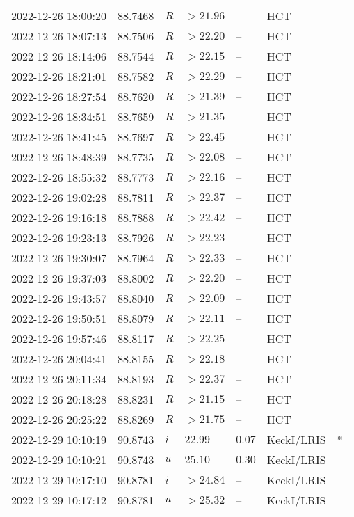 \documentclass{nature_plusfigure}
\begin{document}
\begin{supplement}
\begin{center}
\begin{longtable}{lllllll}
2022-12-26 18:00:20 & 88.7468 & $R$ & $>21.96$ & -- & HCT &  \\ 
2022-12-26 18:07:13 & 88.7506 & $R$ & $>22.20$ & -- & HCT &  \\ 
2022-12-26 18:14:06 & 88.7544 & $R$ & $>22.15$ & -- & HCT &  \\ 
2022-12-26 18:21:01 & 88.7582 & $R$ & $>22.29$ & -- & HCT &  \\ 
2022-12-26 18:27:54 & 88.7620 & $R$ & $>21.39$ & -- & HCT &  \\ 
2022-12-26 18:34:51 & 88.7659 & $R$ & $>21.35$ & -- & HCT &  \\ 
2022-12-26 18:41:45 & 88.7697 & $R$ & $>22.45$ & -- & HCT &  \\ 
2022-12-26 18:48:39 & 88.7735 & $R$ & $>22.08$ & -- & HCT &  \\ 
2022-12-26 18:55:32 & 88.7773 & $R$ & $>22.16$ & -- & HCT &  \\ 
2022-12-26 19:02:28 & 88.7811 & $R$ & $>22.37$ & -- & HCT &  \\ 
2022-12-26 19:16:18 & 88.7888 & $R$ & $>22.42$ & -- & HCT &  \\ 
2022-12-26 19:23:13 & 88.7926 & $R$ & $>22.23$ & -- & HCT &  \\ 
2022-12-26 19:30:07 & 88.7964 & $R$ & $>22.33$ & -- & HCT &  \\ 
2022-12-26 19:37:03 & 88.8002 & $R$ & $>22.20$ & -- & HCT &  \\ 
2022-12-26 19:43:57 & 88.8040 & $R$ & $>22.09$ & -- & HCT &  \\ 
2022-12-26 19:50:51 & 88.8079 & $R$ & $>22.11$ & -- & HCT &  \\ 
2022-12-26 19:57:46 & 88.8117 & $R$ & $>22.25$ & -- & HCT &  \\ 
2022-12-26 20:04:41 & 88.8155 & $R$ & $>22.18$ & -- & HCT &  \\ 
2022-12-26 20:11:34 & 88.8193 & $R$ & $>22.37$ & -- & HCT &  \\ 
2022-12-26 20:18:28 & 88.8231 & $R$ & $>21.15$ & -- & HCT &  \\ 
2022-12-26 20:25:22 & 88.8269 & $R$ & $>21.75$ & -- & HCT &  \\ 
2022-12-29 10:10:19 & 90.8743 & $i$ & $22.99$ & $0.07$ & KeckI/LRIS & * \\ 
2022-12-29 10:10:21 & 90.8743 & $u$ & $25.10$ & $0.30$ & KeckI/LRIS &  \\ 
2022-12-29 10:17:10 & 90.8781 & $i$ & $>24.84$ & -- & KeckI/LRIS &  \\ 
2022-12-29 10:17:12 & 90.8781 & $u$ & $>25.32$ & -- & KeckI/LRIS &  \\ 

\end{longtable}
\end{center}
\end{supplement}
\end{document}
